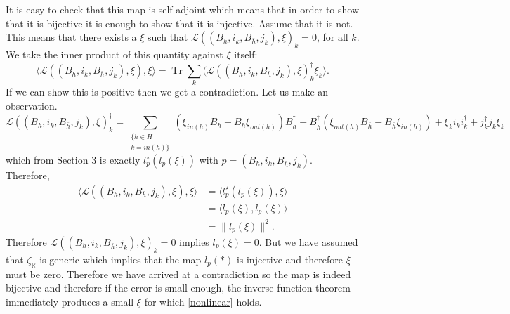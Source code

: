 \documentclass[12pt,oneside,reqno]{amsart}
\theoremstyle{definition}
\numberwithin{equation}{section}
\numberwithin{theorem}{section}
\newcommand{\R}{\mathbb{R}}
\newcommand{\Tr}{\operatorname{Tr}}
\begin{document}
%
It is easy to check that this map is self-adjoint which means that in order to show that it is bijective it is enough to show that it is injective. Assume that it is not. This means that there exists a $\xi$ such that $\mathcal L((B_h,i_k,B_{\bar h}, j_k),\xi)_k = 0$, for all $k$. We take the inner product of this quantity against $\xi$ itself: 
%
\begin{equation}
\langle \mathcal L((B_h,i_k,B_{\bar h}, j_k),\xi), \xi\rangle = \Tr \sum\limits_{k}(\mathcal L((B_h,i_k,B_{\bar h}, j_k),\xi)^{\dagger}_k\xi_k\rangle.
\end{equation}
%
If we can show this is positive then we get a contradiction. Let us make an observation. 
%
\begin{equation}
\mathcal L((B_h,i_k,B_{\bar h}, j_k),\xi)^{\dagger}_k = \sum\limits_{\substack{\{h\in H\\k=in(h)\}}} (\xi_{in(h)}B_h - B_h\xi_{out(h)})B_h^{\dagger} - B_{\bar h}^{\dagger}(\xi_{out(h)}B_{\bar h} - B_{\bar h}\xi_{in(h)}) + \xi_ki_ki_k^{\dagger} + j_k^{\dagger}j_k\xi_k
\end{equation}
%
which from Section $3$ is exactly $l^{\star}_p(l_p(\xi))$ with $p = (B_h,i_k,B_{\bar h}, j_k)$. Therefore, 
%
\begin{equation}
\begin{split}
\langle \mathcal L((B_h,i_k,B_{\bar h}, j_k),\xi), \xi\rangle &= \langle l^{\star}_p(l_p(\xi)),\xi\rangle\\
&= \langle l_p(\xi),l_p(\xi)\rangle\\
&= \|l_p(\xi)\|^2. 
\end{split}
\end{equation}
%
Therefore $\mathcal L((B_h,i_k,B_{\bar h}, j_k),\xi)_k = 0$ implies $l_p(\xi)=0$. But we have assumed that $\zeta_{\R}$ is generic which  implies that the map $l_p(*)$ is injective and therefore $\xi $ must be zero. Therefore we have arrived at a contradiction so the map is indeed bijective and therefore if the error is small enough, the inverse function theorem immediately produces a small $\xi$ for which \eqref{nonlinear} holds.  
\end{document}
